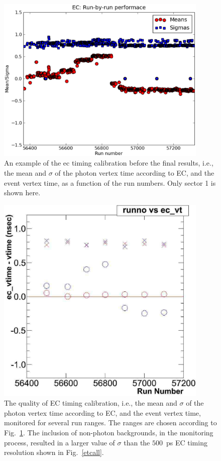 \begin{figure}[h]
\begin{center}
 \includegraphics[width=0.9\textwidth]{figures/calib/ec/ec_vtimebyrunsec.eps}
  \caption{An example of the ec timing calibration before the final results, i.e., the mean and $\sigma$ of the photon vertex time according to EC, and the event vertex time, as a function of the run numbers. Only sector 1 is shown here.}
  \label{ectrunsec}
  \end{center}
\end{figure}

\begin{figure}[h]
\begin{center}
 \includegraphics[width=0.9\textwidth]{figures/calib/ec/ec_vtimebyrun.eps}
  \caption{The quality of EC timing calibration, i.e., the mean and $\sigma$ of the photon vertex time according to EC, and the event vertex time, monitored for several run ranges. The ranges are chosen according to Fig.~\ref{ectrunsec}. The inclusion of non-photon backgrounds, in the monitoring process, resulted in a larger value of $\sigma$ than the $500$~ps EC timing resolution shown in Fig.~\ref{etcall}. }
  \label{ectrun}
  \end{center}
\end{figure}

